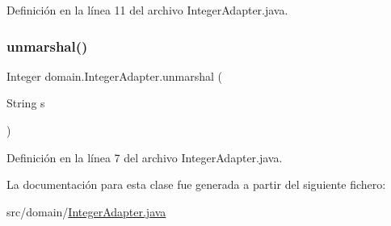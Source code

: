 Definición en la línea 11 del archivo Integer\+Adapter.\+java.


\begin{DoxyCode}{0}

\end{DoxyCode}
\mbox{\label{classdomain_1_1IntegerAdapter_ad2bfc5af140573682dd03906b9264b51}} 
\subsubsection{\texorpdfstring{unmarshal()}{unmarshal()}}
{\footnotesize\ttfamily Integer domain.\+Integer\+Adapter.\+unmarshal (\begin{DoxyParamCaption}\item[{String}]{s }\end{DoxyParamCaption})}



Definición en la línea 7 del archivo Integer\+Adapter.\+java.


\begin{DoxyCode}{0}

\end{DoxyCode}


La documentación para esta clase fue generada a partir del siguiente fichero\+:\begin{DoxyCompactItemize}
\item 
src/domain/\mbox{\hyperlink{IntegerAdapter_8java}{Integer\+Adapter.\+java}}\end{DoxyCompactItemize}
